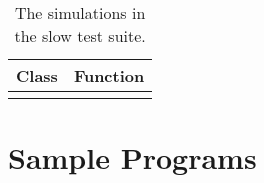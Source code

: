 \begin{table}
\centering
\caption{
The simulations in the slow test suite.}
\begin{tabular}{ c c  }
\hline
Class & Function \\
\hline

\hline
\label{tab:SlowSimulationList}
\end{tabular}
\end{table}




\section{Sample Programs} 
